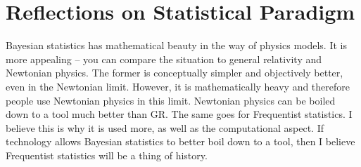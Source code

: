 \chapter{Reflections on Statistical Paradigm}
Bayesian statistics has mathematical beauty in the way of physics models. It is more appealing -- you can compare the situation to general relativity and Newtonian physics. The former is conceptually simpler and objectively better, even in the Newtonian limit. However, it is mathematically heavy and therefore people use Newtonian physics in this limit. Newtonian physics can be boiled down to a tool much better than GR. The same goes for Frequentist statistics. I believe this is why it is used more, as well as the computational aspect. If technology allows Bayesian statistics to better boil down to a tool, then I believe Frequentist statistics will be a thing of history.

